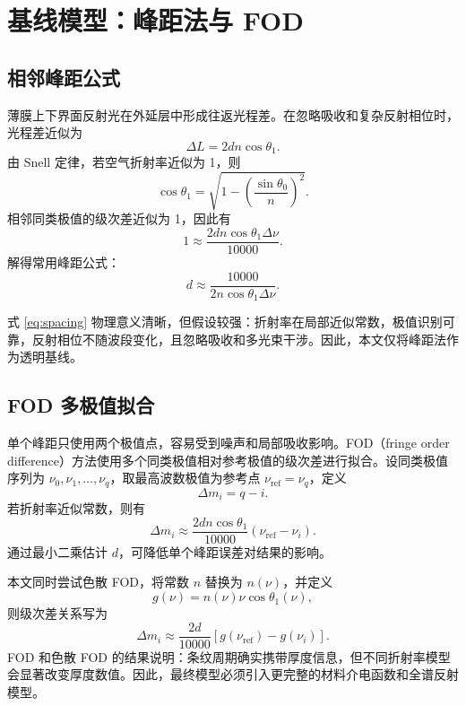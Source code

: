 \documentclass[UTF8,a4paper,12pt]{ctexart}
\begin{document}
\section{基线模型：峰距法与 FOD}

\subsection{相邻峰距公式}

薄膜上下界面反射光在外延层中形成往返光程差。在忽略吸收和复杂反射相位时，光程差近似为
\begin{equation}
\Delta L=2dn\cos\theta_1.
\end{equation}
由 Snell 定律，若空气折射率近似为 1，则
\begin{equation}
\cos\theta_1=
\sqrt{1-\left(\frac{\sin\theta_0}{n}\right)^2}.
\end{equation}
相邻同类极值的级次差近似为 1，因此有
\begin{equation}
1\approx
\frac{2dn\cos\theta_1\Delta\nu}{10000}.
\end{equation}
解得常用峰距公式：
\begin{equation}
d\approx
\frac{10000}{2n\cos\theta_1\Delta\nu}.
\label{eq:spacing}
\end{equation}

式 \eqref{eq:spacing} 物理意义清晰，但假设较强：折射率在局部近似常数，极值识别可靠，反射相位不随波段变化，且忽略吸收和多光束干涉。因此，本文仅将峰距法作为透明基线。

\subsection{FOD 多极值拟合}

单个峰距只使用两个极值点，容易受到噪声和局部吸收影响。FOD（fringe order difference）方法使用多个同类极值相对参考极值的级次差进行拟合。设同类极值序列为 $\nu_0,\nu_1,\ldots,\nu_q$，取最高波数极值为参考点 $\nu_{\mathrm{ref}}=\nu_q$，定义
\begin{equation}
\Delta m_i=q-i.
\end{equation}
若折射率近似常数，则有
\begin{equation}
\Delta m_i\approx
\frac{2dn\cos\theta_1}{10000}
(\nu_{\mathrm{ref}}-\nu_i).
\end{equation}
通过最小二乘估计 $d$，可降低单个峰距误差对结果的影响。

本文同时尝试色散 FOD，将常数 $n$ 替换为 $n(\nu)$，并定义
\begin{equation}
g(\nu)=n(\nu)\nu\cos\theta_1(\nu),
\end{equation}
则级次差关系写为
\begin{equation}
\Delta m_i\approx
\frac{2d}{10000}
\left[g(\nu_{\mathrm{ref}})-g(\nu_i)\right].
\end{equation}
FOD 和色散 FOD 的结果说明：条纹周期确实携带厚度信息，但不同折射率模型会显著改变厚度数值。因此，最终模型必须引入更完整的材料介电函数和全谱反射模型。
\end{document}
